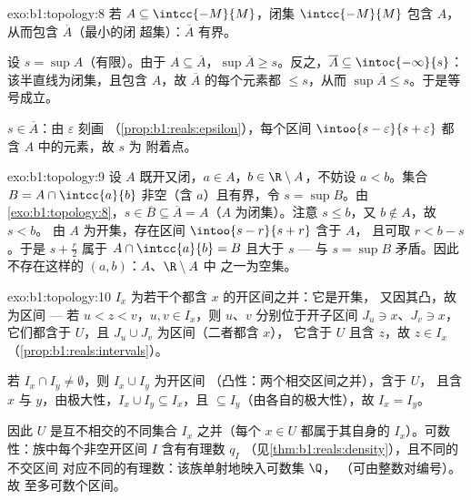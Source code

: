 \begin{solution}{exo:b1:topology:8}
若 $A \subseteq \intcc{-M}{M}$，闭集 $\intcc{-M}{M}$
包含 $A$，从而包含 $\overline A$（最小的闭
超集）：$\overline A$ 有界。

设 $s = \sup A$（有限）。由于 $A \subseteq \overline A$，$\sup
\overline A \geq s$。反之，$\overline A \subseteq
\intoc{-\infty}{s}$：该半直线为闭集，且包含 $A$，故
$\overline A$ 的每个元素都 $\leq s$，从而 $\sup\overline A
\leq s$。于是等号成立。

$s \in \overline A$：由 $\varepsilon$ 刻画
（\cref{prop:b1:reals:epsilon}），每个区间 $\intoo{s -
\varepsilon}{s + \varepsilon}$ 都含 $A$ 中的元素，故 $s$ 为
附着点。
\end{solution}

\begin{solution}{exo:b1:topology:9}
设 $A$ 既开又闭，$a \in A$，$b \in \R
\setminus A$，不妨设 $a < b$。集合 $B = A \cap
\intcc{a}{b}$ 非空（含 $a$）且有界，令 $s = \sup B$。由
\cref{exo:b1:topology:8}，$s \in \overline B \subseteq \overline A =
A$（$A$ 为闭集）。注意 $s \leq b$，又 $b \notin A$，故 $s < b$。
由 $A$ 为开集，存在区间 $\intoo{s - r}{s + r}$ 含于 $A$，
且可取 $r < b - s$。于是 $s + \frac{r}{2}$ 属于 $A
\cap \intcc{a}{b} = B$ 且大于 $s$ --- 与 $s = \sup
B$ 矛盾。因此不存在这样的 $(a, b)$：$A$、$\R \setminus A$ 中
之一为空集。
\end{solution}

\begin{solution}{exo:b1:topology:10}
$I_x$ 为若干个都含 $x$ 的开区间之并：它是开集，
又因其凸，故为区间 --- 若 $u < z < v$，$u, v \in
I_x$，则 $u$、$v$ 分别位于开子区间 $J_u \ni x$、$J_v \ni
x$，它们都含于 $U$，且 $J_u \cup J_v$ 为区间（二者都含 $x$），
它含于 $U$ 且含 $z$，故 $z \in I_x$
（\cref{prop:b1:reals:intervals}）。

若 $I_x \cap I_y \neq \emptyset$，则 $I_x \cup I_y$ 为开区间
（凸性：两个相交区间之并），含于 $U$，
且含 $x$ 与 $y$，由极大性，$I_x \cup I_y \subseteq I_x$，且
$\subseteq I_y$（由各自的极大性），故 $I_x = I_y$。

因此 $U$ 是互不相交的不同集合 $I_x$ 之并（每个 $x \in
U$ 都属于其自身的 $I_x$）。可数性：族中每个非空开区间
$I$ 含有有理数 $q_I$
（见\cref{thm:b1:reals:density}），且不同的不交区间
对应不同的有理数：该族单射地映入可数集 $\Q$，
（可由整数对编号）。故
至多可数个区间。
\end{solution}

